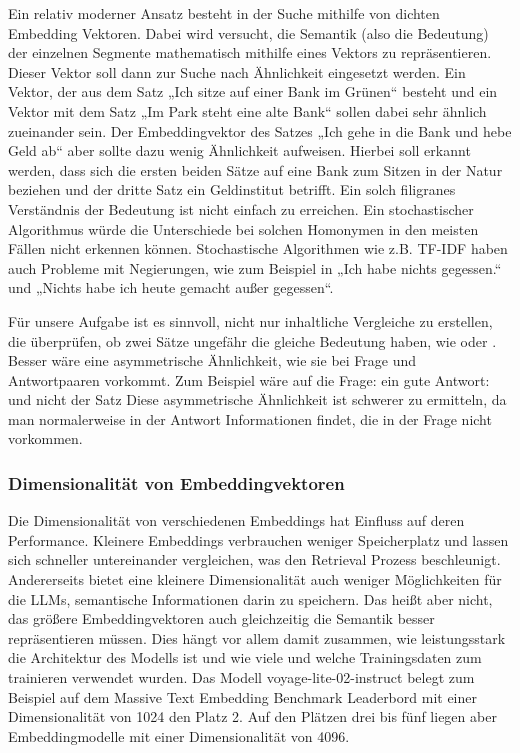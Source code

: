 Ein relativ moderner Ansatz besteht in der Suche mithilfe von dichten Embedding Vektoren. 
Dabei wird versucht, die Semantik (also die Bedeutung) der einzelnen Segmente mathematisch mithilfe eines Vektors zu repräsentieren. 
Dieser Vektor soll dann zur Suche nach Ähnlichkeit eingesetzt werden. 
Ein Vektor, der aus dem Satz „Ich sitze auf einer Bank im Grünen“ besteht und ein Vektor mit dem Satz „Im Park steht eine alte Bank“ sollen dabei sehr ähnlich zueinander sein. 
Der Embeddingvektor des Satzes „Ich gehe in die Bank und hebe Geld ab“ aber sollte dazu wenig Ähnlichkeit aufweisen. 
Hierbei soll erkannt werden, dass sich die ersten beiden Sätze auf eine Bank zum Sitzen in der Natur beziehen und der dritte Satz ein Geldinstitut betrifft. 
Ein solch filigranes Verständnis der Bedeutung ist nicht einfach zu erreichen. 
Ein stochastischer Algorithmus würde die Unterschiede bei solchen Homonymen in den meisten Fällen nicht erkennen können. 
Stochastische Algorithmen wie z.B. TF-IDF haben auch Probleme mit Negierungen, wie zum Beispiel in „Ich habe nichts gegessen.“ und „Nichts habe ich heute gemacht außer gegessen“.

Für unsere Aufgabe ist es sinnvoll, nicht nur inhaltliche Vergleiche zu erstellen, die überprüfen, ob zwei Sätze ungefähr die gleiche Bedeutung haben, wie  oder .
Besser wäre eine asymmetrische Ähnlichkeit, wie sie bei Frage und Antwortpaaren vorkommt.
Zum Beispiel wäre auf die Frage:  ein gute Antwort:   und nicht der Satz 
Diese asymmetrische Ähnlichkeit ist schwerer zu ermitteln, da man normalerweise in der Antwort Informationen findet, die in der Frage nicht vorkommen.

\subsubsection{Dimensionalität von Embeddingvektoren}

Die Dimensionalität von verschiedenen Embeddings hat Einfluss auf deren Performance.
Kleinere Embeddings verbrauchen weniger Speicherplatz und lassen sich schneller untereinander vergleichen, was den Retrieval Prozess beschleunigt.
Andererseits bietet eine kleinere Dimensionalität auch weniger Möglichkeiten für die LLMs, semantische Informationen darin zu speichern.
Das heißt aber nicht, das größere Embeddingvektoren auch gleichzeitig die Semantik besser repräsentieren müssen.
Dies hängt vor allem damit zusammen, wie leistungsstark die Architektur des Modells ist und wie viele und welche Trainingsdaten zum trainieren verwendet wurden.
Das Modell voyage-lite-02-instruct belegt zum Beispiel auf dem Massive Text Embedding Benchmark Leaderbord mit einer Dimensionalität von 1024 den Platz 2.
Auf den Plätzen drei bis fünf liegen aber Embeddingmodelle mit einer Dimensionalität von 4096.


